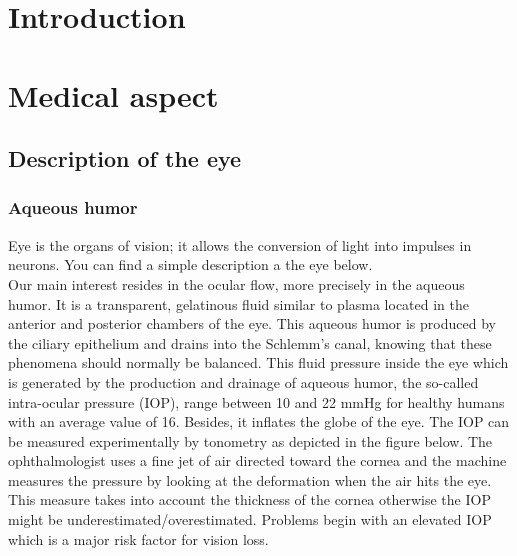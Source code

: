 \documentclass[english,12pt]{article}
\begin{document}
\vskip25mm
\section{Introduction}\label{S1}

\section{Medical aspect}\label{s2}
\subsection{Description of the eye}
\subsubsection{Aqueous humor }
Eye is the organs of vision; it allows the conversion of light into impulses in neurons. You can find a simple description a the eye below.\\
Our main interest resides in the ocular flow, more precisely in the aqueous humor. It is a transparent, gelatinous fluid similar to plasma located in the anterior and posterior chambers of the eye. This aqueous humor is produced by the ciliary epithelium and drains into the Schlemm's canal, knowing that these phenomena should normally be balanced.
This fluid pressure inside the eye which is generated by the production and drainage of aqueous humor, the so-called intra-ocular pressure (IOP), range between 10 and 22 mmHg for healthy humans with an average value of 16. Besides, it inflates the globe of the eye.
The IOP can be measured experimentally by tonometry as depicted in the figure below.
 The ophthalmologist uses a fine jet of air directed toward the cornea and the machine measures the pressure by looking at the deformation when the air hits the eye. This measure takes into account the thickness of the cornea otherwise the IOP might be underestimated/overestimated.
Problems begin with an elevated IOP which is a major risk factor for vision loss.
\end{document}
